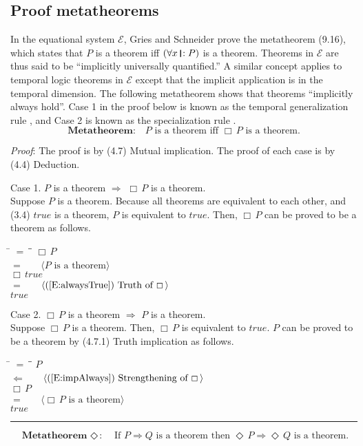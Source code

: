 \documentclass[12pt, fleqn, leqno]{article}
\newcommand{\lgap}{2pt}                             %
\newcommand{\mymathindent}{24pt}                    %
\newcommand{\impl}{\ensuremath{\Rightarrow}}        %
\newcommand{\foll}{\ensuremath{\Leftarrow}}         %
\newcommand{\Event}{\Diamond\,}
\newcommand{\Always}{\Box\,}
\newcommand{\myqed}{\rule[-.23ex]{1.2ex}{2.0ex}}
\newcommand{\myqedtab}{\hspace{384pt}}              %
\newcommand{\thedr}{\rule[-.25ex]{.32mm}{1.75ex}}   %
\newcommand{\drrb}{\;\thedr\,{:}\;}                 %
\newcommand{\all}{\forall}                          %
\newcommand{\Gll} {\langle}                         %
\newcommand{\Ggg} {\rangle}                         %
\newcommand{\Hint}[1]     {\ \ \ $\Gll              \mbox{#1} \Ggg$ }   %
\begin{document}
\subsection{Proof metatheorems}

In the equational system $\mathcal{E}$, Gries and Schneider \cite{LADM} prove the metatheorem (9.16), which states that
$P$ is a theorem iff $(\all x\drrb P)$ is a theorem.
Theorems in $\mathcal{E}$ are thus said to be ``implicitly universally quantified.''
A similar concept applies to temporal logic theorems in $\mathcal{E}$ except that the implicit application is in the temporal dimension.
The following metatheorem shows that theorems ``implicitly always hold''.
Case 1 in the proof below is known as the temporal generalization rule \cite{Schn}, and Case 2 is known as the specialization rule \cite{Manna}.
\begin{equation}\label{E:metatheorem}
\textbf{Metatheorem:}\quad P \text{ is a theorem iff } \Always P \text{ is a theorem.}
\end{equation}

\emph{Proof}: The proof is by (4.7) Mutual implication.
The proof of each case is by (4.4) Deduction.

Case 1. $P$ is a theorem $\impl$ $\Always P$ is a theorem.\\
Suppose $P$ is a theorem.
Because all theorems are equivalent to each other, and (3.4) $true$ is a theorem, $P$ is equivalent to $true$.
Then, $\Always P$ can be proved to be a theorem as follows.
\begin{tabbing}
\hspace{\mymathindent} \= $= \;$ \= \myqedtab \= \kill
\> \> $\Always P$\\[\lgap]
\> $=$ \> \Hint{$P$ is a theorem} \\[\lgap]
\> \> $\Always true$\\[\lgap]
\> $=$ \> \Hint{(\ref{E:alwaysTrue}) Truth of $\Always$} \\[\lgap]
\> \> $true$
\end{tabbing}

Case 2. $\Always P$ is a theorem $\impl$ $P$ is a theorem.\\
Suppose $\Always P$ is a theorem.
Then, $\Always P$ is equivalent to $true$.
$P$ can be proved to be a theorem by (4.7.1) Truth implication as follows.
\begin{tabbing}
\hspace{\mymathindent} \= $= \;$ \= \myqedtab \= \kill
\> \> $P$\\[\lgap]
\> $\foll$ \> \Hint{(\ref{E:impAlways}) Strengthening of $\Always$} \\[\lgap]
\> \> $\Always P$\\[\lgap]
\> $=$ \> \Hint{$\Always P$ is a theorem} \\[\lgap]
\> \> $true$ \quad \myqed
\end{tabbing}
\begin{equation}\label{E:metaEvent}
\textbf{Metatheorem $\Event$:}\quad \text{If } P\impl Q \text{ is a theorem then } \Event P\impl\Event Q \text{ is a theorem.}
\end{equation}
\end{document}
